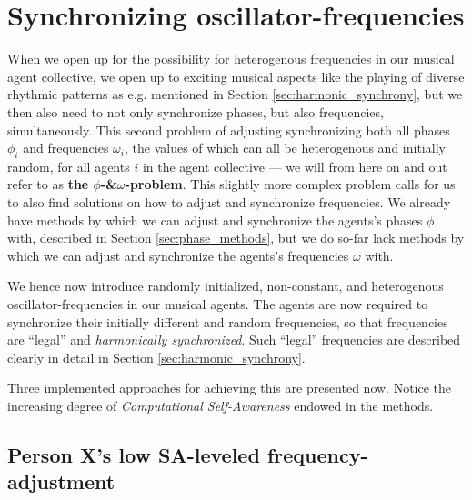 	

\section{Synchronizing oscillator-frequencies}
\label{sec:frequency_methods}


	When we open up for the possibility for heterogenous frequencies in our musical agent collective, we open up to exciting musical aspects like the playing of diverse rhythmic patterns as e.g. mentioned in Section \ref{sec:harmonic_synchrony}, but we then also need to not only synchronize phases, but also frequencies, simultaneously. This second problem of adjusting synchronizing both all phases $\phi_i$ and frequencies $\omega_i$, the values of which can all be heterogenous and initially random, for all agents $i$ in the agent collective — we will from here on and out refer to as \textbf{the $\phi$-\&$\omega$-problem}. This slightly more complex problem calls for us to also find solutions on how to adjust and synchronize frequencies. We already have methods by which we can adjust and synchronize the agents's phases $\phi$ with, described in Section \ref{sec:phase_methods}, but we do so-far lack methods by which we can adjust and synchronize the agents's frequencies $\omega$ with.
	
	We hence now introduce randomly initialized, non-constant, and heterogenous oscillator-frequencies in our musical agents. The agents are now required to synchronize their initially different and random frequencies, so that frequencies are ``legal'' and \textit{harmonically synchronized}. Such ``legal'' frequencies are described clearly in detail in Section \ref{sec:harmonic_synchrony}.
	
	Three implemented approaches for achieving this are presented now. Notice the increasing degree of \textit{Computational Self-Awareness} endowed in the methods.
	
	
	
	
	\subsection{Person X's low SA-leveled frequency-adjustment}
	
